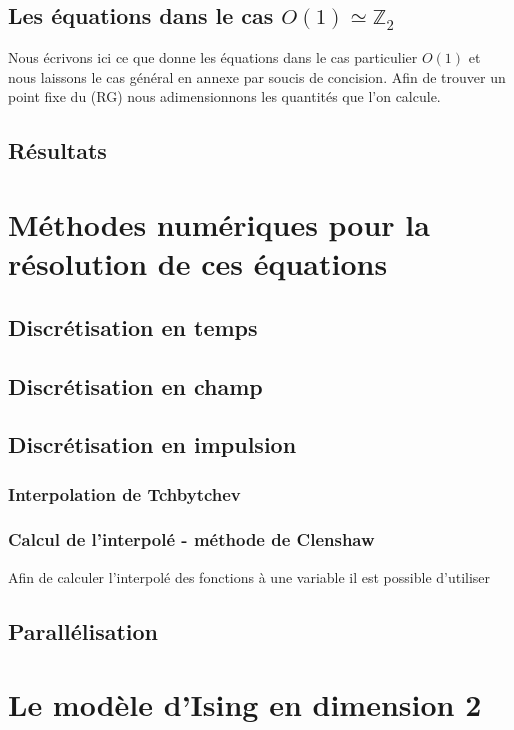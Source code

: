 \documentclass[10pt]{article}
\begin{document}
\begin{multicols}{2}
\subsection{Les équations dans le cas $O(1) \simeq \mathbb{Z}_2$}

Nous écrivons ici ce que donne les équations dans le cas particulier $O(1)$ et nous laissons le cas général en annexe par soucis de concision. Afin de trouver un point fixe du (RG) nous adimensionnons les quantités que l'on calcule. 
\lipsum[1]
\vspace*{11pt}
\subsection{Résultats}
\lipsum[1]


\section{Méthodes numériques pour la résolution de ces équations}
\subsection{Discrétisation en temps}
\subsection{Discrétisation en champ}
\subsection{Discrétisation en impulsion}
\subsubsection{Interpolation de Tchbytchev }
\subsubsection{Calcul de l'interpolé - méthode de Clenshaw}

Afin de calculer l'interpolé des fonctions à une variable il est possible d'utiliser
\subsection{Parallélisation}






\pagebreak
\section{Le modèle d'Ising en dimension 2}


\end{multicols}
\end{document}
